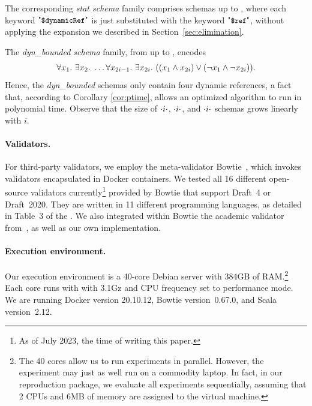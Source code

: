 The corresponding  \emph{stat schema} family comprises
 {\DFour} schemas  up to , where each keyword $\qddref$
is just substituted with the keyword $\qdref$, without applying the expansion we described in Section~\ref{sec:elimination}.

The \emph{dyn\_bounded schema} family, from  up to ,
encodes
$$\forall x_1.\ \exists x_2.\ \ldots 
\forall x_{2i-1}.\ \exists x_{2i}.\ 
((x_{1} \And x_{2i}) \Or (\Not x_{1} \And \Not x_{2i})).$$
Hence, the  \emph{dyn\_bounded} schemas only contain four dynamic references, a fact that, according to Corollary \ref{cor:ptime}, allows an optimized algorithm to run in polynomial time.
Observe that the size of \qkw{dyn}$\cdot i\cdot$\qkw{.js}, \qkw{dyn.bonded}$\cdot i\cdot$\qkw{.js}, and \qkw{stat}$\cdot i\cdot$\qkw{.js} schemas grows linearly with $i$. %



\paragraph{Validators.} 

For third-party validators, we employ the meta-validator Bowtie~\citep{bowtie}, which invokes validators encapsulated in Docker containers. 
%
We tested all 16 different open-source validators currently\footnote{As of July 2023, the time of writing this paper.} provided by Bowtie that support Draft~4 or Draft~2020.
They are written in 11 different programming languages, as detailed 
in Table~3 of the {\FV}.
We also integrated within Bowtie the academic
validator from~\citep{DBLP:conf/www/PezoaRSUV16}, as well as our own implementation.



\paragraph{Execution environment.}
Our execution environment is a 40-core Debian server with 384GB of RAM.\footnote{The 40 cores allow us to run experiments in parallel. However, the experiment may just as well run on a commodity laptop. In fact, in our reproduction package, we evaluate all experiments sequentially, assuming that 2 CPUs and 6MB of memory are assigned to the virtual machine.} Each core runs with with 3.1Gz and CPU frequency set to performance mode.
We are running Docker version 20.10.12, Bowtie version~0.67.0, and Scala version~2.12.

